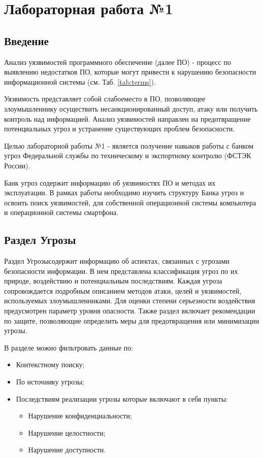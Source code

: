 \documentclass[areasetadvanced]{scrartcl}
\begin{document}
\newpage
\tableofcontents

\newpage
\section{Лабораторная работа №1}
\subsection*{Введение}

Анализ уязвимостей программного обеспечение (далее ПО) - процесс по выявлению недостатков ПО, которые могут
привести к нарушению безопасности информационной системы (см. Таб. \ref{tab:terms}).

Уязвимость представляет собой \guillemetleft слабое\guillemetright место в ПО, позволяющее злоумышленнику осуществить несанкционированный доступ, атаку или получить контроль над информацией.
Анализ уязвимостей направлен на предотвращение потенциальных угроз и устранение существующих проблем безопасности.

Целью лабораторной работы №1 - является получение навыков работы с банком угроз Федеральной службы по техническому и экспортному контролю (ФСТЭК России).

Банк угроз содержит информацию об уязвимостях ПО и методах их эксплуатации. В рамках работы необходимо изучить структуру Банка угроз 
и освоить поиск уязвимостей, для собственной операционной системы компьютера и операционной системы смартфона. 

\subsection{Раздел \guillemetleft Угрозы\guillemetright}

Раздел \guillemetleft Угрозы\guillemetright содержит информацию об аспектах, связанных с угрозами безопасности информации.
В нем представлена классификация угроз по их природе, воздействию и потенциальным последствиям.
Каждая угроза сопровождается подробным описанием методов атаки, целей и уязвимостей, используемых злоумышленниками.
Для оценки степени серьезности воздействия предусмотрен параметр уровня опасности.
Также раздел включает рекомендации по защите, позволяющие определить меры для предотвращения или минимизации угрозы.

В разделе можно фильтровать данные по: 
\begin{itemize}
    \item Контекстному поиску;
    \item По источнику угрозы;
    \item Последствиям реализации угрозы которые включают в себя пункты: \begin{itemize}
        \item Нарушение конфиденциальности;
        \item Нарушение целостности;
        \item Нарушение доступности.
    \end{itemize}
\end{itemize}
\end{document}
